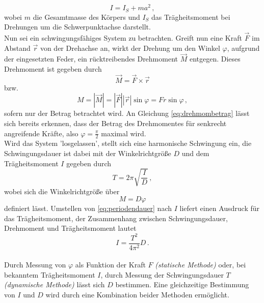 \begin{equation}
    I = I_S + ma^2\,,
    \label{eq:steiner}
\end{equation}
wobei $m$ die Gesamtmasse des Körpers und $I_S$ das Trägheitsmoment bei Drehungen um die Schwerpunktachse darstellt. \\

Nun sei ein schwingungsfähiges System zu betrachten. Greift nun eine Kraft $\vec{F}$ im Abstand $\vec{r}$ von der Drehachse an, wirkt der Drehung um den Winkel $\varphi$, aufgrund der eingesetzten Feder,
ein rücktreibendes Drehmoment $\vec{M}$ entgegen. 
Dieses Drehmoment ist gegeben durch
\begin{equation*}
    \vec{M} = \vec{F} \times \vec{r}
\end{equation*}
bzw.
\begin{equation}
    M = |\vec{M}| = |\vec{F}||\vec{r}| \sin\varphi = F r \sin\varphi\,,
    \label{eq:drehmombetrag}
\end{equation}
sofern nur der Betrag betrachtet wird.
An Gleichung \eqref{eq:drehmombetrag} lässt sich bereits erkennen, dass der Betrag des Drehmomentes für senkrecht angreifende Kräfte, also $\varphi=\frac{π}{2}$ maximal wird. \\

Wird das System 'losgelassen', stellt sich eine harmonische Schwingung ein, die Schwingungsdauer ist dabei mit der Winkelrichtgröße $D$ und dem Trägheitsmoment $I$ gegeben durch
\begin{equation}
    T = 2 π \sqrt{\frac{I}{D}}\,,
    \label{eq:periodendauer}
\end{equation}
wobei sich die Winkelrichtgröße über
\begin{equation}
    M = D \varphi
    \label{eq:winkelrichtgröße}
\end{equation}
definiert lässt. 
Umstellen von \eqref{eq:periodendauer} nach $I$ liefert einen Ausdruck für das Trägheitsmoment, der Zusammenhang zwischen Schwingungsdauer, Drehmoment und Trägheitsmoment lautet
\begin{equation}
    I = \frac{T^2}{4 π^2} D \,.
    \label{eq:trägüschwi}
\end{equation}\\

Durch Messung von $\varphi$ als Funktion der Kraft $F$ \textit{(statische Methode)} oder, bei bekanntem Trägheitsmoment $I$, durch Messung der Schwingungsdauer $T$ \textit{(dynamische Methode)} lässt sich
$D$ bestimmen. Eine gleichzeitige Bestimmung von $I$ und $D$ wird durch eine Kombination beider Methoden ermöglicht. \\

